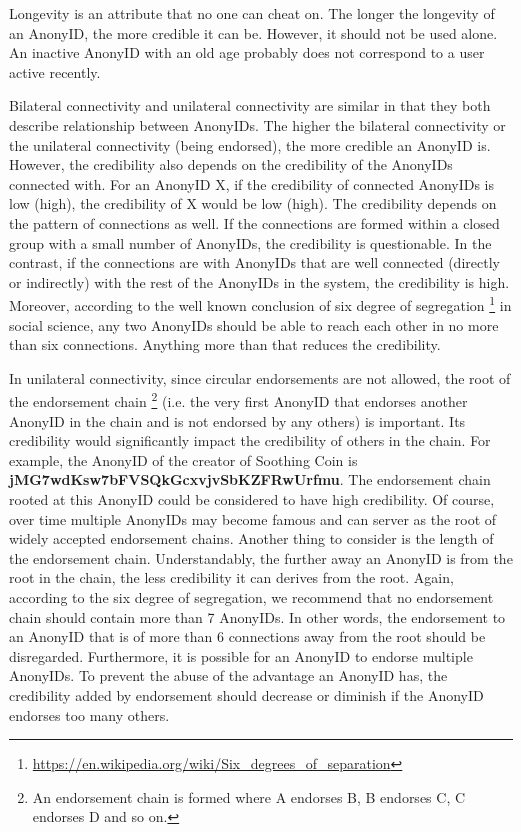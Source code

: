 \documentclass[12pt, a4paper]{article}
\begin{document}
Longevity is an attribute that no one can cheat on. The longer the longevity of an AnonyID, the more credible it can be. However, it should not be used alone. An inactive AnonyID with an old age probably does not correspond to a user active recently. 

Bilateral connectivity and unilateral connectivity are similar in that they both describe relationship between AnonyIDs. The higher the bilateral connectivity or the unilateral connectivity (being endorsed), the more credible an AnonyID is. However, the credibility also depends on the credibility of the AnonyIDs connected with. For an AnonyID X, if the credibility of connected AnonyIDs is low (high), the credibility of X would be low (high). The credibility depends on the pattern of connections as well. If the connections are formed within a closed group with a small number of AnonyIDs, the credibility is questionable. In the contrast, if the connections are with AnonyIDs that are well connected (directly or indirectly) with the rest of the AnonyIDs in the system, the credibility is high. Moreover, according to the well known conclusion of six degree of segregation \footnote{\href{https://en.wikipedia.org/wiki/Six\_degrees\_of\_separation}{https://en.wikipedia.org/wiki/Six\_degrees\_of\_separation}} in social science, any two AnonyIDs should be able to reach each other in no more than six connections. Anything more than that reduces the credibility.

In unilateral connectivity, since circular endorsements are not allowed, the root of the endorsement chain \footnote{An endorsement chain is formed where A endorses B, B endorses C, C endorses D and so on.}  (i.e. the very first AnonyID that endorses another AnonyID in the chain and is not endorsed by any others) is important. Its credibility would significantly impact the credibility of others in the chain. For example, the AnonyID of the creator of Soothing Coin is \textbf{jMG7wdKsw7bFVSQkGcxvjvSbKZFRwUrfmu}. The endorsement chain rooted at this AnonyID could be considered to have high credibility. Of course, over time multiple AnonyIDs may become famous and can server as the root of widely accepted endorsement chains. Another thing to consider is the length of the endorsement chain. Understandably, the further away an AnonyID is from the root in the chain, the less credibility it can derives from the root. Again, according to the six degree of segregation, we recommend that no endorsement chain should contain more than 7 AnonyIDs. In other words, the endorsement to an AnonyID that is of more than 6 connections away from the root should be disregarded. Furthermore, it is possible for an AnonyID to endorse multiple AnonyIDs. To prevent the abuse of the advantage an AnonyID has, the credibility added by endorsement should decrease or diminish if the AnonyID endorses too many others.
\end{document}
